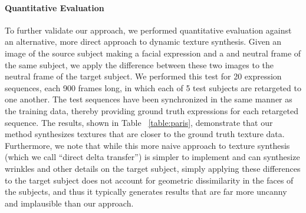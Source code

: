 \paragraph{Quantitative Evaluation}

To further validate our approach, we performed quantitative evaluation against an alternative, more direct approach to dynamic texture synthesis. Given an image of the source subject making a facial expression and a and neutral frame of the same subject, we apply the difference between these two images to the neutral frame of the target subject. We performed this test for 20 expression sequences, each 900 frames long, in which each of 5 test subjects are retargeted to one another. The test sequences have been synchronized in the same manner as the training data, thereby providing ground truth expressions for each retargeted sequence. The results, shown in Table ~\ref{table:paris}, demonstrate that our method synthesizes textures that are closer to the ground truth texture data. Furthermore, we note that while this more naive approach to texture synthesis (which we call ``direct delta transfer'') is simpler to implement and can synthesize wrinkles and other details on the target subject, simply applying these differences to the target subject does not account for geometric dissimilarity in the faces of the subjects, and thus it typically generates results that are far more uncanny and implausible than our approach.

\begin{table}[h!]
\begin{center}
\end{center}
\caption{Quantitative evaluation against a more direct texture synthesis approach.}
\vspace{-0.2in}
\label{table:paris}
\end{table}



